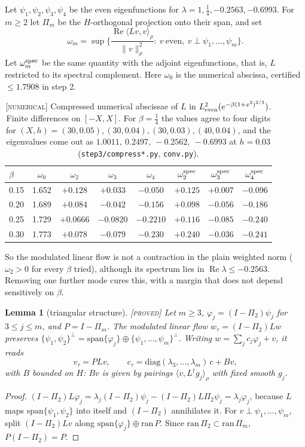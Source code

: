 \documentclass[11pt]{amsart}
\newtheorem{lemma}[theorem]{Lemma}
\theoremstyle{remark}
\newcommand{\ip}[2]{\langle #1,#2\rangle}
\newcommand{\re}{\operatorname{Re}}
\newcommand{\lab}[1]{\textup{\textsc{[#1]}}}
\begin{document}
Let $\psi_1,\psi_2,\psi_3,\psi_4$ be the even eigenfunctions for $\lambda=1,\frac14,-0.2563,-0.6993$. For $m\ge2$ let $\Pi_m$ be the $H$-orthogonal projection onto their span, and set
\[
\omega_m=\sup\Big\{\frac{\re\ip{Lv}{v}_\rho}{\|v\|_\rho^2}:\ v\ \text{even},\ v\perp\psi_1,\dots,\psi_m\Big\}.
\]
Let $\omega_m^{\rm spec}$ be the same quantity with the adjoint eigenfunctions, that is, $L$ restricted to its spectral complement. Here $\omega_0$ is the numerical abscissa, certified $\le1.7908$ in step 2.

\begin{table}[h]
\centering
\begin{tabular}{@{}lccccccc@{}}
\toprule
$\beta$ & $\omega_0$ & $\omega_2$ & $\omega_3$ & $\omega_4$ & $\omega_2^{\rm spec}$ & $\omega_3^{\rm spec}$ & $\omega_4^{\rm spec}$\\
\midrule
0.15 & 1.652 & $+0.128$ & $+0.033$ & $-0.050$ & $+0.125$ & $+0.007$ & $-0.096$\\
0.20 & 1.689 & $+0.084$ & $-0.042$ & $-0.156$ & $+0.098$ & $-0.056$ & $-0.186$\\
0.25 & 1.729 & $+0.0666$ & $-0.0820$ & $-0.2210$ & $+0.116$ & $-0.085$ & $-0.240$\\
0.30 & 1.773 & $+0.078$ & $-0.079$ & $-0.230$ & $+0.240$ & $-0.036$ & $-0.241$\\
\bottomrule
\end{tabular}
\caption{\lab{numerical} Compressed numerical abscissae of $L$ in $L^2_{\rm even}(e^{-\beta(1+x^2)^{2/3}})$. Finite differences on $[-X,X]$. For $\beta=\frac14$ the values agree to four digits for $(X,h)=(30,0.05),(30,0.04),(30,0.03),(40,0.04)$, and the eigenvalues come out as $1.0011,\ 0.2497,\ -0.2562,\ -0.6993$ at $h=0.03$ (\texttt{step3/compress*.py}, \texttt{conv.py}).}
\label{tab:omega}
\end{table}

So the modulated linear flow is not a contraction in the plain weighted norm ($\omega_2>0$ for every $\beta$ tried), although its spectrum lies in $\re\lambda\le-0.2563$. Removing one further mode cures this, with a margin that does not depend sensitively on $\beta$.

\begin{lemma}[triangular structure]\label{lem:tri}\lab{proved}
Let $m\ge3$, $\varphi_j=(I-\Pi_2)\psi_j$ for $3\le j\le m$, and $P=I-\Pi_m$. The modulated linear flow $w_\tau=(I-\Pi_2)Lw$ preserves $\{\psi_1,\psi_2\}^\perp=\mathrm{span}\{\varphi_j\}\oplus\{\psi_1,\dots,\psi_m\}^\perp$. Writing $w=\sum_j c_j\varphi_j+v$, it reads
\[
v_\tau=PLv,\qquad c_\tau=\mathrm{diag}(\lambda_3,\dots,\lambda_m)\,c+Bv,
\]
with $B$ bounded on $H$: $Bv$ is given by pairings $\ip{v}{L^\dagger g_j}_\rho$ with fixed smooth $g_j$.
\end{lemma}
\begin{proof}
$(I-\Pi_2)L\varphi_j=\lambda_j(I-\Pi_2)\psi_j-(I-\Pi_2)L\Pi_2\psi_j=\lambda_j\varphi_j$, because $L$ maps $\mathrm{span}\{\psi_1,\psi_2\}$ into itself and $(I-\Pi_2)$ annihilates it. For $v\perp\psi_1,\dots,\psi_m$, split $(I-\Pi_2)Lv$ along $\mathrm{span}\{\varphi_j\}\oplus\mathrm{ran}\,P$. Since $\mathrm{ran}\,\Pi_2\subset\mathrm{ran}\,\Pi_m$, $P(I-\Pi_2)=P$.
\end{proof}
\end{document}
